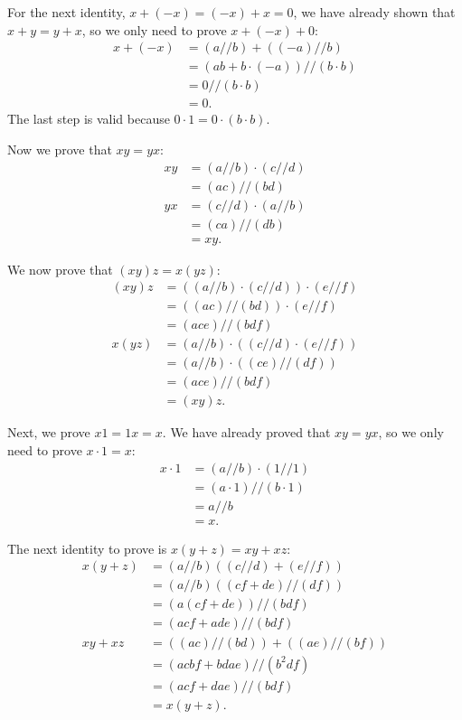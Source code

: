 \documentclass[12pt, oneside]{book}
\begin{document}
	For the next identity, $x + (-x) = (-x) + x = 0$, we have already shown that $x + y = y + x$, so we only need to prove $x + (-x) + 0$:
	\[\begin{split}
		x + (-x) &= (a // b) + ((-a) // b) \\
		&= (ab + b \cdot (-a)) // (b \cdot b) \\
		&= 0 // (b \cdot b) \\
		&= 0.
	\end{split}\]
	The last step is valid because $0 \cdot 1 = 0 \cdot (b \cdot b)$.

	Now we prove that $xy = yx$:
	\begin{align*}
		xy &= (a // b) \cdot (c // d) \\
		&= (ac) // (bd) \\
		yx &= (c // d) \cdot (a // b) \\
		&= (ca) // (db) \\
		&= xy.
	\end{align*}

	We now prove that $(xy)z = x(yz)$:
	\begin{align*}
		(xy)z &= ((a // b) \cdot (c // d)) \cdot (e // f) \\
		&= ((ac) // (bd)) \cdot (e // f) \\
		&= (ace) // (bdf) \\
		x(yz) &= (a // b) \cdot ((c // d) \cdot (e // f)) \\
		&= (a // b) \cdot ((ce) // (df)) \\
		&= (ace) // (bdf) \\
		&= (xy)z.
	\end{align*}

	Next, we prove $x1 = 1x = x$. We have already proved that $xy = yx$, so we only need to prove $x \cdot 1 = x$:
	\[\begin{split}
		x \cdot 1 &= (a // b) \cdot (1 // 1) \\
		&= (a \cdot 1) // (b \cdot 1) \\
		&= a // b \\
		&= x.
	\end{split}\]

	The next identity to prove is $x(y + z) = xy + xz$:
	\begin{align*}
		x(y + z) &= (a // b)((c // d) + (e // f)) \\
		&= (a // b)((cf + de) // (df)) \\
		&= (a(cf + de)) // (bdf) \\
		&= (acf + ade) // (bdf) \\
		xy + xz &= ((ac) // (bd)) + ((ae) // (bf)) \\
		&= (acbf + bdae) // (b^2 df) \\
		&= (acf + dae) // (bdf) \\
		&= x(y + z).
	\end{align*}
\end{document}
